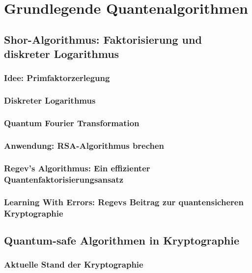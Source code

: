 \chapter{Grundlegende Quantenalgorithmen}
\label{basic_algorithms} %




\section{Shor-Algorithmus: Faktorisierung und diskreter Logarithmus}
\subsection{Idee: Primfaktorzerlegung}
\subsection{Diskreter Logarithmus}
\subsection{Quantum Fourier Transformation}
\subsection{Anwendung: RSA-Algorithmus brechen}
\subsection{Regev's Algorithmus: Ein effizienter Quantenfaktorisierungsansatz}
\subsection{Learning With Errors: Regevs Beitrag zur quantensicheren Kryptographie}

\section{Quantum-safe Algorithmen in Kryptographie}
\subsection{Aktuelle Stand der Kryptographie}
